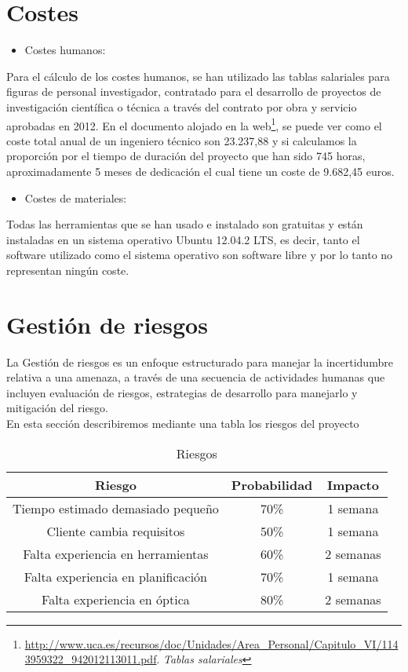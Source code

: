 \section{Costes}
\begin{itemize}
\item Costes humanos:
\end{itemize}
Para el cálculo de los costes humanos, se han utilizado las tablas salariales para figuras de personal investigador, contratado para el desarrollo de 
proyectos de investigación científica o técnica a través del contrato por obra y servicio aprobadas en 2012. En el documento alojado en la web\footnote{\url{http://www.uca.es/recursos/doc/Unidades/Area_Personal/Capitulo_VI/1143959322_942012113011.pdf}. \textit{Tablas salariales}}, se puede ver como el coste total anual de un ingeniero técnico son 23.237,88 y si calculamos la proporción por el tiempo de duración del proyecto que han sido 745 horas, aproximadamente 5 meses de dedicación el cual tiene un coste de 9.682,45 euros.
\begin{itemize}
\item Costes de materiales:
\end{itemize}
Todas las herramientas que se han usado e instalado son gratuitas y están instaladas en un sistema operativo Ubuntu 12.04.2 LTS, es decir, tanto el software utilizado como el sistema operativo son software libre y por lo tanto no representan ningún coste.

\newpage
\section{Gestión de riesgos}
La Gestión de riesgos es un enfoque estructurado para manejar la incertidumbre relativa a una amenaza, a través de una secuencia de actividades humanas que incluyen evaluación de riesgos, estrategias de desarrollo para manejarlo y mitigación del riesgo.\\
En esta sección describiremos mediante una tabla los riesgos del proyecto %
\\
\begin{table}[ht]
\centering  %
\begin{tabular}{c c c} %
\hline\hline                        %
Riesgo & Probabilidad & Impacto \\ [0.5ex] %
\hline                  %
Tiempo estimado demasiado pequeño & 70\% & 1 semana  \\ %
Cliente cambia requisitos & 50\% & 1 semana \\
Falta experiencia en herramientas & 60\% & 2 semanas \\
Falta experiencia en planificación & 70\% & 1 semana \\
Falta experiencia en óptica & 80\% & 2 semanas  \\ [1ex]      %
\hline %
\end{tabular}
\label{Riesgos} %
\caption{Riesgos} %
\end{table}

